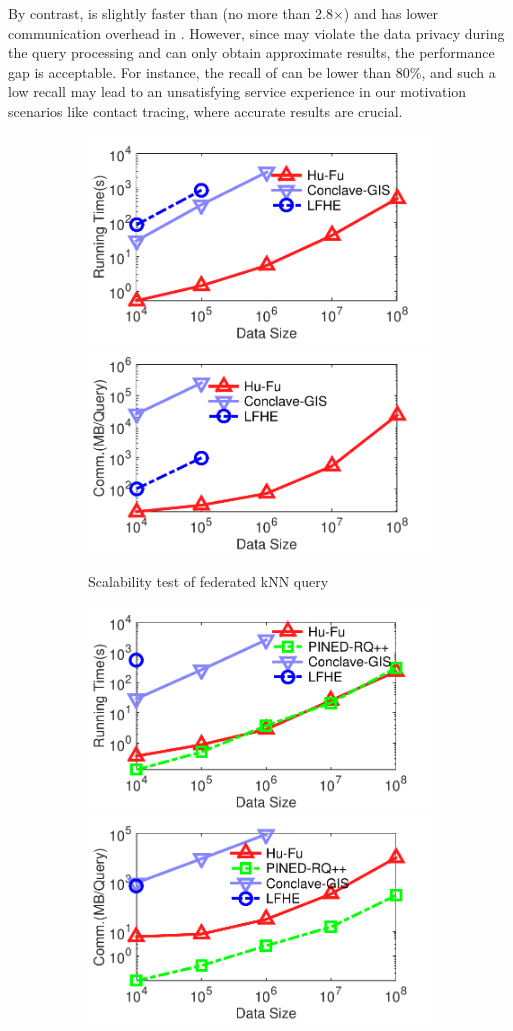 By contrast, \ICDE is slightly faster than \sysname (no more than 2.8$\times$) and has lower communication overhead in .
However, since \ICDE may violate the data privacy during the query processing and can only obtain approximate results,
the performance gap is acceptable.
For instance, the recall of \ICDE can be lower than 80\%, and such a low recall may lead to an unsatisfying service experience in our motivation scenarios like contact tracing, where accurate results are crucial.

\begin{figure}[t]
    \centering
    \begin{subfigure}{0.48\textwidth}
        \centering
        \includegraphics[width=0.48\linewidth]{osm_knn_size_time.pdf}
        \includegraphics[width=0.48\linewidth]{osm_knn_size_comm.pdf}
        \caption{Scalability test of federated kNN query}
        \label{fig:sca-knn-eff-size-n}
    \end{subfigure}
    \begin{subfigure}{0.48\textwidth}
        \centering
        \includegraphics[width=0.48\linewidth]{osm_rangequery_size_time.pdf}
        \includegraphics[width=0.48\linewidth]{osm_rangequery_size_comm.pdf}

\end{subfigure}
\end{figure}
